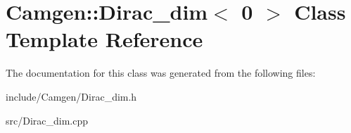 \hypertarget{a00130}{}\section{Camgen\+:\+:Dirac\+\_\+dim$<$ 0 $>$ Class Template Reference}
\label{a00130}


The documentation for this class was generated from the following files\+:\begin{DoxyCompactItemize}
\item 
include/\+Camgen/Dirac\+\_\+dim.\+h\item 
src/Dirac\+\_\+dim.\+cpp\end{DoxyCompactItemize}

